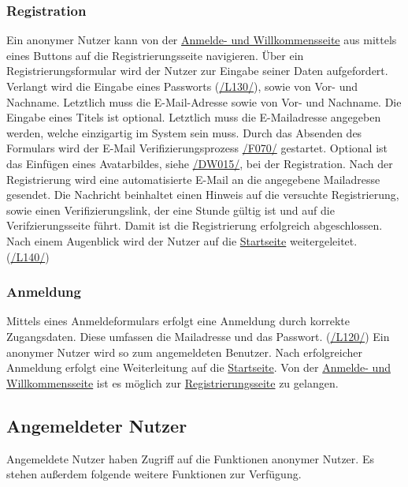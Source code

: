 \subsubsection{Registration}\label{an:reg}
\begin{description}
     Ein anonymer Nutzer kann von der \hyperref[an:log]{Anmelde- und Willkommensseite} aus mittels eines
    Buttons auf die Registrierungsseite navigieren.
     Über ein Registrierungsformular wird der Nutzer zur Eingabe seiner
    Daten aufgefordert. Verlangt wird die Eingabe eines Passworts (\hyperref[leist:130]{/L130/}),
    sowie von Vor- und Nachname. Letztlich muss die E-Mail-Adresse
    sowie von Vor- und Nachname. Die Eingabe eines Titels ist optional. Letztlich muss die E-Mailadresse
    angegeben werden, welche einzigartig im System sein muss. Durch das Absenden des Formulars wird der E-Mail Verifizierungsprozess
    \hyperref[funkt:070]{/F070/} gestartet.
     Optional ist das Einfügen eines Avatarbildes, siehe \hyperref[d015]{/DW015/},
    bei der Registration.
     Nach der Registrierung wird eine automatisierte E-Mail
    an die angegebene Mailadresse gesendet. Die Nachricht beinhaltet einen Hinweis auf
    die versuchte Registrierung, sowie einen Verifizierungslink, der eine Stunde gültig ist und auf die Verifzierungsseite führt.
    Damit ist die Registrierung erfolgreich abgeschlossen. Nach einem Augenblick wird der Nutzer
    auf die \hyperref[nut:start]{Startseite} weitergeleitet. (\hyperref[leist:140]{/L140/})
\end{description}

\subsubsection{Anmeldung}\label{an:log}
\begin{description}
     Mittels eines Anmeldeformulars erfolgt eine Anmeldung durch korrekte Zugangsdaten.
    Diese umfassen die Mailadresse und das Passwort. (\hyperref[leist:120]{/L120/})
    Ein anonymer Nutzer wird so zum angemeldeten Benutzer.
    Nach erfolgreicher Anmeldung erfolgt eine Weiterleitung auf die \hyperref[nut:start]{Startseite}.
     Von der \hyperref[an:log]{Anmelde- und Willkommensseite} ist es möglich zur \hyperref[an:reg]{Registrierungsseite} zu gelangen.
\end{description}

\subsection{Angemeldeter Nutzer}
Angemeldete Nutzer haben Zugriff auf die Funktionen anonymer Nutzer.
Es stehen außerdem folgende weitere Funktionen zur Verfügung.

